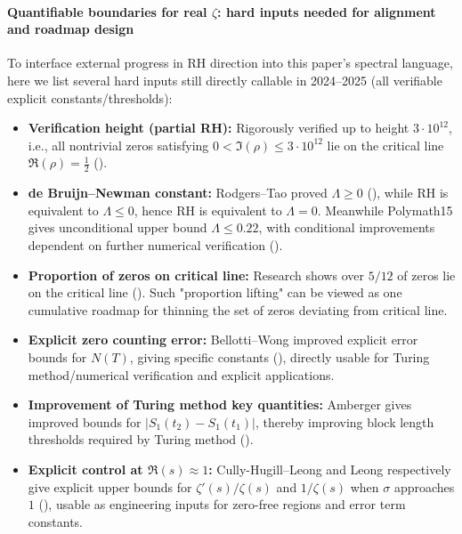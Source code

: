 \paragraph{Quantifiable boundaries for real \texorpdfstring{$\zeta$}{zeta}: hard inputs needed for alignment and roadmap design}
To interface external progress in RH direction into this paper's spectral language, here we list several hard inputs still directly callable in 2024--2025 (all verifiable explicit constants/thresholds):
\begin{itemize}
  \item \textbf{Verification height (partial RH):} Rigorously verified up to height \(3\cdot 10^{12}\), i.e., all nontrivial zeros satisfying \(0<\Im(\rho)\le 3\cdot 10^{12}\) lie on the critical line \(\Re(\rho)=\tfrac12\) (\cite{PlattTrudgian2020RH3e12}).
  \item \textbf{de Bruijn--Newman constant:} Rodgers--Tao proved \(\Lambda\ge 0\) (\cite{RodgersTao2018NewmanNonnegative}), while RH is equivalent to \(\Lambda\le 0\), hence RH is equivalent to \(\Lambda=0\). Meanwhile Polymath15 gives unconditional upper bound \(\Lambda\le 0.22\), with conditional improvements dependent on further numerical verification (\cite{Polymath2019NewmanUpper}).
  \item \textbf{Proportion of zeros on critical line:} Research shows over \(5/12\) of zeros lie on the critical line (\cite{PrattRoblesZaharescuZeindler2018FiveTwelfths}). Such "proportion lifting" can be viewed as one cumulative roadmap for thinning the set of zeros deviating from critical line.
  \item \textbf{Explicit zero counting error:} Bellotti--Wong improved explicit error bounds for \(N(T)\), giving specific constants (\cite{BellottiWong2024ImprovedNT}), directly usable for Turing method/numerical verification and explicit applications.
  \item \textbf{Improvement of Turing method key quantities:} Amberger gives improved bounds for \(|S_1(t_2)-S_1(t_1)|\), thereby improving block length thresholds required by Turing method (\cite{Amberger2025S1}).
  \item \textbf{Explicit control at \(\Re(s)\approx 1\):} Cully-Hugill--Leong and Leong respectively give explicit upper bounds for \(\zeta'(s)/\zeta(s)\) and \(1/\zeta(s)\) when \(\sigma\) approaches \(1\) (\cite{CullyHugillLeong2023Zeta1Line,Leong2024LogDerivRecip}), usable as engineering inputs for zero-free regions and error term constants.
\end{itemize}

